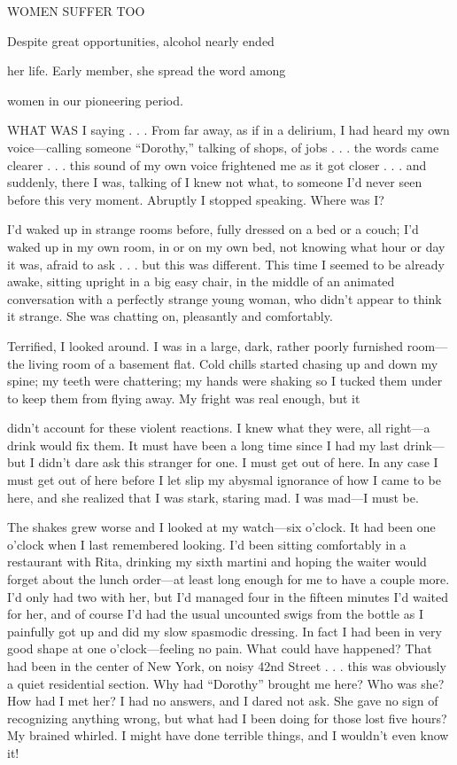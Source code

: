 

\begin{biblechapter}

WOMEN SUFFER TOO

Despite great opportunities, alcohol nearly ended

her life. Early member, she spread the word among

women in our pioneering period.

      WHAT WAS I saying . . . From far away, as if in a delirium, I had heard my own voice—calling someone “Dorothy,” talking of shops, of jobs . . . the words came clearer . . . this sound of my own voice frightened me as it got closer . . . and suddenly, there I was, talking of I knew not what, to someone I’d never seen before this very moment. Abruptly I stopped speaking. Where was I?

I’d waked up in strange rooms before, fully dressed on a bed or a couch; I’d waked up in my own room, in or on my own bed, not knowing what hour or day it was, afraid to ask . . . but this was different. This time I seemed to be already awake, sitting upright in a big easy chair, in the middle of an animated conversation with a perfectly strange young woman, who didn’t appear to think it strange. She was chatting on, pleasantly and comfortably.

Terrified, I looked around. I was in a large, dark, rather poorly furnished room—the living room of a basement flat. Cold chills started chasing up and down my spine; my teeth were chattering; my hands were shaking so I tucked them under to keep them from flying away. My fright was real enough, but it

didn’t account for these violent reactions. I knew what they were, all right—a drink would fix them. It must have been a long time since I had my last drink—but I didn’t dare ask this stranger for one. I must get out of here. In any case I must get out of here before I let slip my abysmal ignorance of how I came to be here, and she realized that I was stark, staring mad. I was mad—I must be.

The shakes grew worse and I looked at my watch—six o’clock. It had been one o’clock when I last remembered looking. I’d been sitting comfortably in a restaurant with Rita, drinking my sixth martini and hoping the waiter would forget about the lunch order—at least long enough for me to have a couple more. I’d only had two with her, but I’d managed four in the fifteen minutes I’d waited for her, and of course I’d had the usual uncounted swigs from the bottle as I painfully got up and did my slow spasmodic dressing. In fact I had been in very good shape at one o’clock—feeling no pain. What could have happened? That had been in the center of New York, on noisy 42nd Street . . . this was obviously a quiet residential section. Why had “Dorothy” brought me here? Who was she? How had I met her? I had no answers, and I dared not ask. She gave no sign of recognizing anything wrong, but what had I been doing for those lost five hours? My brained whirled. I might have done terrible things, and I wouldn’t even know it!


\end{biblechapter}
